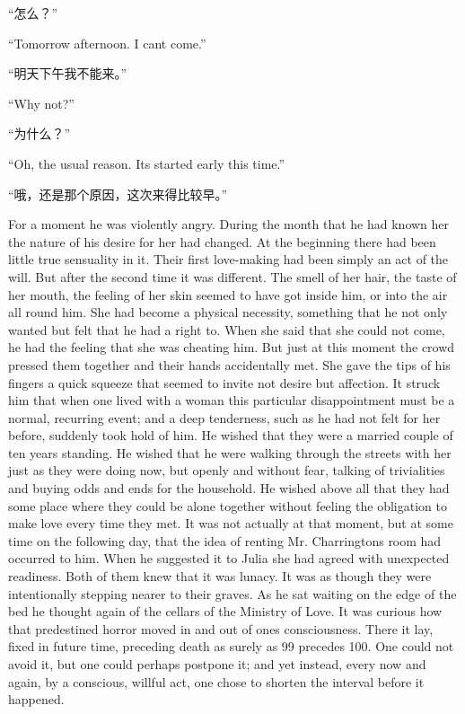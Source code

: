 \begin{paracol}{2}
``怎么？''

\switchcolumn*

``Tomorrow afternoon. I can\textquotesingle t come.''

\switchcolumn

``明天下午我不能来。''

\switchcolumn*

``Why not?''

\switchcolumn

``为什么？''

\switchcolumn*

``Oh, the usual reason. It\textquotesingle s started early this time.''

\switchcolumn

``哦，还是那个原因，这次来得比较早。''

\switchcolumn*

For a moment he was violently angry. During the month that he had known
her the nature of his desire for her had changed. At the beginning there
had been little true sensuality in it. Their first love-making had been
simply an act of the will. But after the second time it was different.
The smell of her hair, the taste of her mouth, the feeling of her skin
seemed to have got inside him, or into the air all round him. She had
become a physical necessity, something that he not only wanted but felt
that he had a right to. When she said that she could not come, he had
the feeling that she was cheating him. But just at this moment the crowd
pressed them together and their hands accidentally met. She gave the
tips of his fingers a quick squeeze that seemed to invite not desire but
affection. It struck him that when one lived with a woman this
particular disappointment must be a normal, recurring event; and a deep
tenderness, such as he had not felt for her before, suddenly took hold
of him. He wished that they were a married couple of ten
years\textquotesingle{} standing. He wished that he were walking through
the streets with her just as they were doing now, but openly and without
fear, talking of trivialities and buying odds and ends for the
household. He wished above all that they had some place where they could
be alone together without feeling the obligation to make love every time
they met. It was not actually at that moment, but at some time on the
following day, that the idea of renting Mr.
Charrington\textquotesingle s room had occurred to him. When he
suggested it to Julia she had agreed with unexpected readiness. Both of
them knew that it was lunacy. It was as though they were intentionally
stepping nearer to their graves. As he sat waiting on the edge of the
bed he thought again of the cellars of the Ministry of Love. It was
curious how that predestined horror moved in and out of
one\textquotesingle s consciousness. There it lay, fixed in future time,
preceding death as surely as 99 precedes 100. One could not avoid it,
but one could perhaps postpone it; and yet instead, every now and again,
by a conscious, willful act, one chose to shorten the interval before it
happened.


\end{paracol}
